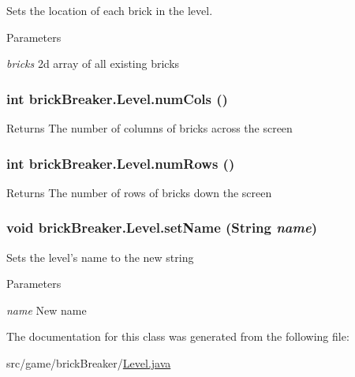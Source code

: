 \label{classbrick_breaker_1_1_level_a2cf993a57ad58665d34d09b9366a39b4}
Sets the location of each brick in the level. 
\begin{DoxyParams}{Parameters}
\item[{\em bricks}]2d array of all existing bricks \end{DoxyParams}
\hypertarget{classbrick_breaker_1_1_level_a3bba82793ace6907c19b5b7d21c9d0c2}{
\subsubsection[{numCols}]{\setlength{\rightskip}{0pt plus 5cm}int brickBreaker.Level.numCols ()}}
\label{classbrick_breaker_1_1_level_a3bba82793ace6907c19b5b7d21c9d0c2}
\begin{DoxyReturn}{Returns}
The number of columns of bricks across the screen 
\end{DoxyReturn}
\hypertarget{classbrick_breaker_1_1_level_a87616f7c125b41d686d6c50477601200}{
\subsubsection[{numRows}]{\setlength{\rightskip}{0pt plus 5cm}int brickBreaker.Level.numRows ()}}
\label{classbrick_breaker_1_1_level_a87616f7c125b41d686d6c50477601200}
\begin{DoxyReturn}{Returns}
The number of rows of bricks down the screen 
\end{DoxyReturn}
\hypertarget{classbrick_breaker_1_1_level_a9658a9bfa4707f92de4891f913377202}{
\subsubsection[{setName}]{\setlength{\rightskip}{0pt plus 5cm}void brickBreaker.Level.setName (String {\em name})}}
\label{classbrick_breaker_1_1_level_a9658a9bfa4707f92de4891f913377202}
Sets the level's name to the new string 
\begin{DoxyParams}{Parameters}
\item[{\em name}]New name \end{DoxyParams}


The documentation for this class was generated from the following file:\begin{DoxyCompactItemize}
\item 
src/game/brickBreaker/\hyperlink{_level_8java}{Level.java}\end{DoxyCompactItemize}
